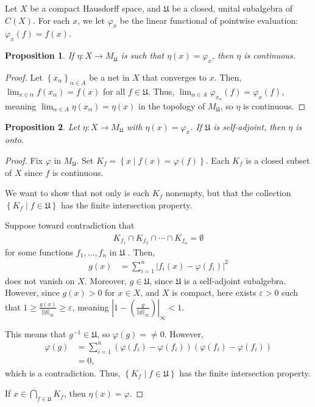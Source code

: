 \documentclass[10pt]{extarticle}
\newcommand{\norm}[1]{\left\Vert #1\right\Vert}
\newcommand{\set}[1]{\left\{#1\right\}}
\newcommand{\ve}{\varepsilon}
\theoremstyle{plain}
\newtheorem*{proposition}{Proposition}
\theoremstyle{definition}
\theoremstyle{note}
\renewcommand{\newline}{\hfill\break}
\begin{document}
Let $X$ be a compact Hausdorff space, and $\mathfrak{U}$ be a closed, unital subalgebra of $C(X)$. For each $x$, we let $\varphi_x$ be the linear functional of pointwise evaluation: $\varphi_x(f) = f(x)$.
\begin{proposition}
  If $\eta: X\rightarrow M_{\mathfrak{U}}$ is such that $\eta(x) = \varphi_x$, then $\eta$ is continuous.
\end{proposition}
\begin{proof}
  Let $\set{x_{\alpha}}_{\alpha \in A}$ be a net in $X$ that converges to $x$. Then, $\lim_{x\in \alpha}f\left(x_{\alpha}\right) = f(x)$ for all $f\in \mathfrak{U}$. Thus, $\lim_{\alpha \in A}\varphi_{x_{\alpha}}\left(f\right) = \varphi_{x}(f)$, meaning $\lim_{\alpha \in A}\eta\left(x_{\alpha}\right) = \eta(x)$ in the topology of $M_{\mathfrak{U}}$, so $\eta$ is continuous.
\end{proof}
\begin{proposition}
  Let $\eta: X\rightarrow M_{\mathfrak{U}}$ with $\eta(x) = \varphi_x$. If $\mathfrak{U}$ is self-adjoint, then $\eta$ is onto.
\end{proposition}
\begin{proof}
  Fix $\varphi$ in $M_{\mathfrak{U}}$. Set $K_{f} = \set{x\mid f(x) = \varphi(f)}$. Each $K_f$ is a closed subset of $X$ since $f$ is continuous.\newline

  We want to show that not only is each $K_f$ nonempty, but that the collection $\set{K_f\mid f\in \mathfrak{U}}$ has the finite intersection property.\newline

  Suppose toward contradiction that
  \begin{align*}
    K_{f_1}\cap K_{f_2}\cap \cdots \cap K_{f_n} = \emptyset
  \end{align*}
  for some functions $f_1,\dots,f_n$ in $\mathfrak{U}$ . Then,
  \begin{align*}
    g(x) &= \sum_{i=1}^{n}\left\vert f_i\left(x\right) - \varphi\left(f_i\right) \right\vert^2
  \end{align*}
  does not vanish on $X$. Moreover, $g\in \mathfrak{U}$, since $\mathfrak{U}$ is a self-adjoint subalgebra. However, since $g(x) > 0$ for $x\in X$, and $X$ is compact, here exists $\ve > 0$ such that $1 \geq \frac{g(x)}{\norm{g}_{\infty}} \geq \ve$, meaning $\left\vert 1 - \left(\frac{g}{\norm{g}_{\infty}}\right) \right\vert_{\infty} < 1$.\newline

  This means that $g^{-1}\in \mathfrak{U}$, so $\varphi(g) =\neq 0$. However,
  \begin{align*}
    \varphi(g) &= \sum_{i=1}^{n}\left(\varphi\left(f_i\right) - \varphi\left(f_i\right)\right)\left(\varphi\left(f_i\right) - \varphi\left(f_i\right)\right)\\
               &= 0,
  \end{align*}
  which is a contradiction. Thus, $\set{K_{f}\mid f\in \mathfrak{U}}$ has the finite intersection property.\newline

  If $x\in \bigcap_{f\in \mathfrak{U}}K_f$, then $\eta(x) = \varphi$.
\end{proof}
\end{document}
